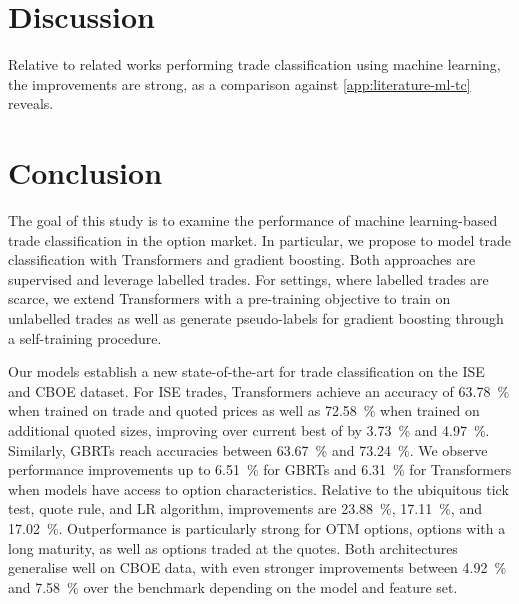 \section{Discussion}\label{sec:discussion}

Relative to related works performing trade classification using machine learning, the improvements are strong, as a comparison against \cref{app:literature-ml-tc} reveals.

\newpage
\section{Conclusion}\label{sec:conclusion}


The goal of this study is to examine the performance of machine learning-based trade classification in the option market. In particular, we propose to model trade classification with Transformers and gradient boosting. Both approaches are supervised and leverage labelled trades. For settings, where labelled trades are scarce, we extend Transformers with a pre-training objective to train on unlabelled trades as well as generate pseudo-labels for gradient boosting through a self-training procedure.

Our models establish a new state-of-the-art for trade classification on the \gls{ISE} and \gls{CBOE} dataset. For \gls{ISE} trades, Transformers achieve an accuracy of \SI{63.78}{\percent} when trained on trade and quoted prices as well as \SI{72.58}{\percent} when trained on additional quoted sizes, improving over current best of \textcite[][27]{grauerOptionTradeClassification2022} by \SI{3.73}{\percent} and \SI{4.97}{\percent}. Similarly, \glspl{GBRT} reach accuracies between \SI{63.67}{\percent} and \SI{73.24}{\percent}. We observe performance improvements up to \SI{6.51}{\percent} for \glspl{GBRT} and \SI{6.31}{\percent} for Transformers when models have access to option characteristics. Relative to the ubiquitous tick test, quote rule, and LR algorithm, improvements are \SI{23.88}{\percent}, \SI{17.11}{\percent}, and \SI{17.02}{\percent}. Outperformance is particularly strong for \gls{OTM} options, options with a long maturity, as well as options traded at the quotes. Both architectures generalise well on \gls{CBOE} data, with even stronger improvements between \SI{4.92}{\percent} and \SI{7.58}{\percent} over the benchmark depending on the model and feature set. 

